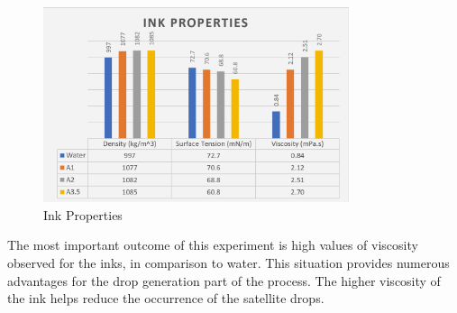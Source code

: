 \begin{figure}[H]
	\centering
	\includegraphics[width=0.8\textwidth]{grafiken/InkProps.jpg}
	\caption{Ink Properties}
	\label{fig:InkProps}
\end{figure} 

\bigskip

The most important outcome of this experiment is high values of viscosity observed for the inks, in comparison to water. This situation provides numerous advantages for the drop generation part of the process. The higher viscosity of the ink helps reduce the occurrence of the satellite drops.


